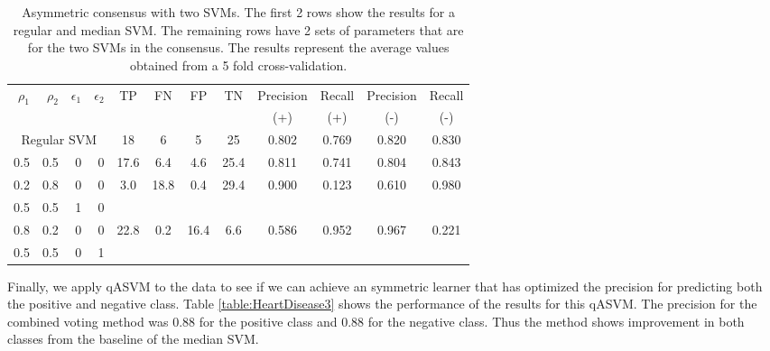 \documentclass[twoside,11pt]{article}
\begin{document}
\begin{table}[htbp]\label{table:HeartDisease2}
  \centering
    \begin{tabular}{rrrr|cccccccc}
    \hline
        \multirow{2}{*}{$\rho_1$} & \multirow{2}{*}{$\rho_2$} & \multirow{2}{*}{$\epsilon_1$} & \multirow{2}{*}{$\epsilon_2$} & \multirow{2}{*}{TP}    & \multirow{2}{*}{FN}    & \multirow{2}{*}{FP}    & \multirow{2}{*}{TN} & Precision & Recall & Precision & Recall\\
    &&&&&&&&  (+) &  (+) &  (-) &  (-) \bigstrut\\
    \hline
    \hline
   \multicolumn{4}{c|}{Regular SVM} & 18    & 6     & 5     & 25    & 0.802 & 0.769 & 0.820 & 0.830 \bigstrut\\
    \hline
    0.5   & 0.5   & 0     & 0     & 17.6  & 6.4   & 4.6   & 25.4  & 0.811 & 0.741 & 0.804 & 0.843 \bigstrut\\
    \hline
    0.2   & 0.8   & 0     & 0     & 3.0   & 18.8  & 0.4   & 29.4  & 0.900 & 0.123 & 0.610 & 0.980 \bigstrut[t]\\
    0.5   & 0.5   & 1     & 0     &       &       &       &       &       &       &       &  \bigstrut[b]\\
    \hline
    0.8   & 0.2   & 0     & 0     & 22.8  & 0.2   & 16.4  & 6.6   & 0.586 & 0.952 & 0.967 & 0.221 \bigstrut[t]\\
    0.5   & 0.5   & 0     & 1     &       &       &       &       &       &       &       &  \bigstrut[b]\\
    \hline
    \hline
    \end{tabular}%
    \caption{Asymmetric consensus with two SVMs. The first 2 rows show the results for a regular and median SVM. The remaining rows have 2 sets of parameters that are for the two SVMs in the consensus. The results represent the average values obtained from a 5 fold cross-validation.}
\end{table}%

Finally, we apply qASVM to the data to see if we can achieve an symmetric learner that has optimized the precision for predicting both the positive and negative class. Table \ref{table:HeartDisease3} shows the performance of the results for this qASVM. The precision for the combined voting method was 0.88 for the positive class and 0.88 for the negative class. Thus the method shows improvement in both classes from the baseline of the median SVM.
\end{document}

